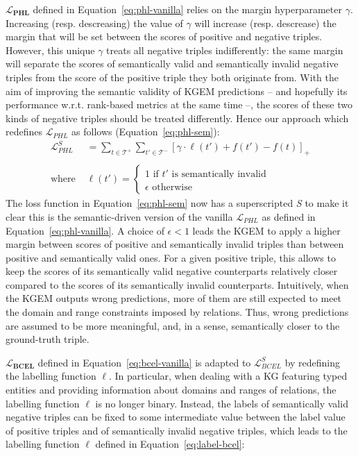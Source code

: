 \documentclass[letterpaper]{article} %
\begin{document}
$\mathbf{\mathcal{L}_{PHL}}$ defined in Equation~\eqref{eq:phl-vanilla} relies on the margin hyperparameter $\gamma$. Increasing (resp. descreasing) the value of $\gamma$ will increase (resp. descrease) the margin that will be set between the scores of positive and negative triples.
However, this unique $\gamma$ treats all negative triples indifferently: the same margin will separate the scores of semantically valid and semantically invalid negative triples from the score of the positive triple they both originate from. With the aim of improving the semantic validity of KGEM predictions -- and hopefully its performance w.r.t. rank-based metrics at the same time --, the scores of these two kinds of negative triples should be treated differently. Hence our approach which redefines $\mathcal{L}_{PHL}$ as follows (Equation~\eqref{eq:phl-sem}):
\begin{equation}
\begin{split}
\mathcal{L}^{S}_{PHL} & = \sum_{t\in\mathcal{T^{+}}} \sum_{t'\in\mathcal{T^{-}}}
\left[ \gamma \cdot \ell(t') + f(t') - f(t) \right]_{+}  \\ \\
\text{where } & \ell(t') = \begin{cases}
    1 \text{ if $t'$ is semantically invalid} \\
    \epsilon \text{ otherwise}
\end{cases}
\label{eq:phl-sem}
\end{split}
\end{equation}
The loss function in Equation~\eqref{eq:phl-sem} now has a superscripted \textit{S} to make it clear this is the semantic-driven version of the vanilla $\mathcal{L}_{PHL}$ as defined in Equation~\eqref{eq:phl-vanilla}. 
A choice of $\epsilon < 1$ leads the KGEM to apply a higher margin between scores of positive and semantically invalid triples than between positive and semantically valid ones. 
For a given positive triple, this allows to keep the scores of its semantically valid negative counterparts relatively closer compared to the scores of its semantically invalid counterparts. Intuitively, when the KGEM outputs wrong predictions, more of them are still expected to meet the domain and range constraints imposed by relations. Thus, wrong predictions are assumed to be more meaningful, and, in a sense, semantically closer to the ground-truth triple. 
	
$\mathbf{\mathcal{L}_{BCEL}}$ defined in Equation~\eqref{eq:bcel-vanilla} is adapted to $\mathcal{L}^{S}_{BCEL}$ by redefining the labelling function $\ell$. In particular, when dealing with a KG featuring typed entities and providing information about domains and ranges of relations, the labelling function $\ell$ is no longer binary. Instead, the labels of semantically valid negative triples can be fixed to some intermediate value between the label value of positive triples and of semantically invalid negative triples, which leads to the labelling function $\ell$ defined in Equation~\eqref{eq:label-bcel}:
\end{document}
